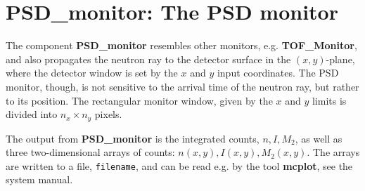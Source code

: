 
\section{PSD\_monitor: The PSD monitor}

The component {\bf PSD\_monitor} resembles other monitors, e.g.
{\bf TOF\_Monitor}, and also propagates the neutron ray to the detector
surface in the $(x,y)$-plane, where the detector window is set
by the $x$ and $y$ input coordinates.
The PSD monitor, though, is not sensitive to the arrival time
of the neutron ray, but rather to its position.
The rectangular monitor window, given by the $x$ and $y$
limits is divided into $n_x \times n_y$ pixels.

The output from {\bf PSD\_monitor} is the integrated counts, $n, I, M_2$,
as well as
three two-dimensional arrays of counts: $n(x,y), I(x,y), M_2(x,y)$.
The arrays are written to a file, \verb+filename+, and can be read e.g. by the tool
{\bf mcplot}, see the system manual.
